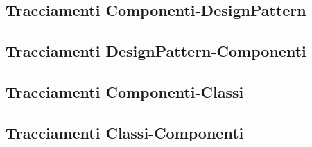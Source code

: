 \subsection{Tracciamenti Componenti-DesignPattern}

\subsection{Tracciamenti DesignPattern-Componenti}

\subsection{Tracciamenti Componenti-Classi}

\subsection{Tracciamenti Classi-Componenti}

